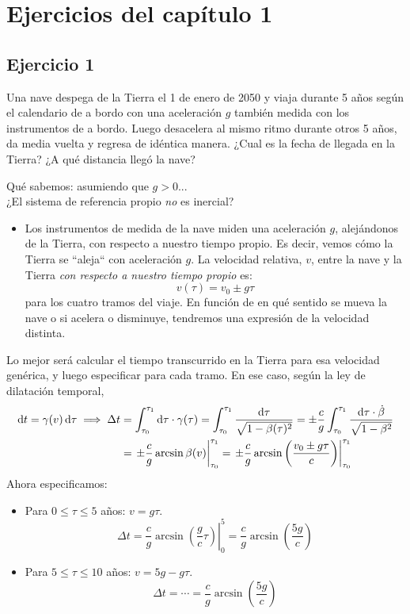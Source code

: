 \chapter*{Ejercicios del capítulo 1}
\section*{Ejercicio 1}
\begin{mybox}
    Una nave despega de la Tierra el 1 de enero de 2050 y viaja durante 5
    años según el calendario de a bordo con una aceleración $g$ también medida
    con los instrumentos de a bordo. Luego desacelera al mismo ritmo durante
    otros 5 años, da media vuelta y regresa de idéntica manera. ¿Cual es la fecha
    de llegada en la Tierra? ¿A qué distancia llegó la nave?
\end{mybox}
Qué sabemos: asumiendo que $g>0$...\\
¿El sistema de referencia propio \emph{no} es inercial?
\begin{itemize}
    \item Los instrumentos de medida de la nave miden una aceleración $g$, alejándonos de la Tierra, con respecto a nuestro tiempo propio. Es decir, vemos cómo la Tierra se  ``aleja``  con aceleración $g$. La velocidad relativa, $v$, entre la nave y la Tierra \emph{con respecto a nuestro tiempo propio} es:
    $$
    v(\tau) = v_0 \pm g\tau 
    $$
    para los cuatro tramos del viaje. En función de en qué sentido se mueva la nave o si acelera o disminuye, tendremos una expresión de la velocidad distinta. 
\end{itemize}
Lo mejor será calcular el tiempo transcurrido en la Tierra para esa velocidad genérica, y luego especificar para cada tramo. En ese caso, según la ley de dilatación temporal,
\begin{equation*}
\begin{split}
    \D{t} = \gamma (v) \D{\tau} \implies \Delta t &= \int_{\tau_0}^{\tau_1} \D{\tau} \cdot \gamma (\tau) = \int_{\tau_0}^{\tau_1} \frac{\D{\tau}}{\sqrt{1-\beta (\tau)^2}} = \pm \frac{c}{g} \int_{\tau_0}^{\tau_1}  \frac{\D{\tau}\cdot \dot{\beta }}{\sqrt{1-\beta ^2}} \\
    &= \left .\pm \frac{c}{g} \arcsin \beta (v) \right |_{\tau_0}^{\tau_1} = \left .\pm \frac{c}{g} \arcsin \left (\frac{v_0\pm g\tau}{c} \right ) \right |_{\tau_0}^{\tau_1}
\end{split}
\end{equation*}
Ahora especificamos:
\begin{itemize}
    \item Para $0\le \tau \le 5$ años: $v = g\tau $.
    $$
    \Delta t = \left . \frac{c}{g}\arcsin \left (\frac{g}{c}\tau \right ) \right |_{0}^{5} = \boxed{\frac{c}{g}\arcsin\left ( \frac{5g}{c} \right )}
    $$

    \item Para $5\le \tau \le 10$ años: $v = 5g - g\tau$.
    $$
    \Delta t = \cdots = \boxed{\frac{c}{g}\arcsin\left ( \frac{5g}{c} \right ) }
    $$
\end{itemize}
